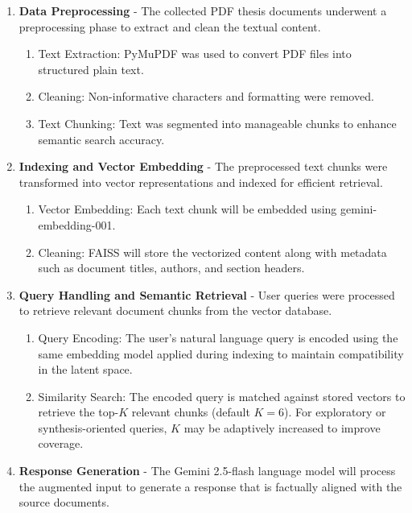 \begin{refsection}
\begin{enumerate}

    \item \textbf{Data Preprocessing} - The collected PDF thesis documents underwent a preprocessing phase to extract and clean the textual content.
        \begin{enumerate}
            \item [(a)] {Text Extraction:} PyMuPDF was used to convert PDF files into structured plain text.
            \item [(b)] {Cleaning:} Non-informative characters and formatting were removed.
            \item [(c)] {Text Chunking:} Text was segmented into manageable chunks to enhance semantic search accuracy.
        \end{enumerate}
        
    \item \textbf{Indexing and Vector Embedding} - The preprocessed text chunks were transformed into vector representations and indexed for efficient retrieval.
        \begin{enumerate}
            \item [(a)] {Vector Embedding:} Each text chunk will be embedded using gemini-embedding-001.
            \item [(b)] {Cleaning:} FAISS will store the vectorized content along with metadata such as document titles, authors, and section headers.
        \end{enumerate}

    \item \textbf{Query Handling and Semantic Retrieval} - User queries were processed to retrieve relevant document chunks from the vector database.
        \begin{enumerate}
            \item [(a)] {Query Encoding:} The user’s natural language query is encoded using the same embedding model applied during indexing to maintain compatibility in the latent space.
            \item [(b)] {Similarity Search:} The encoded query is matched against stored vectors to retrieve the top-$K$ relevant chunks (default $K=6$). For exploratory or synthesis-oriented queries, $K$ may be adaptively increased to improve coverage.
        \end{enumerate}

    \item \textbf{Response Generation} - The Gemini 2.5-flash language model will process the augmented input to generate a response that is factually aligned with the source documents.


\end{enumerate}
\end{refsection}

